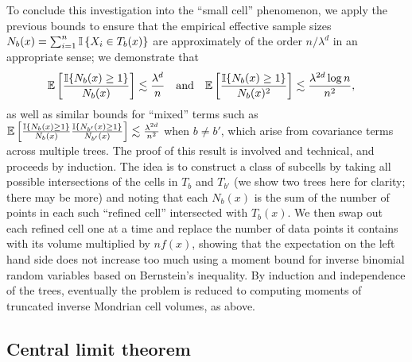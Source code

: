 To conclude this investigation into the ``small cell'' phenomenon,
we apply the previous bounds to
ensure that the empirical effective sample sizes
$N_b(x) = \sum_{i=1}^{n} \mathbb{I} \left\{ X_i \in T_b(x) \right\}$
are approximately of the order $n / \lambda^d$ in an appropriate sense;
we demonstrate that
%
\begin{align*}
  \mathbb{E}\left[
    \frac{\mathbb{I}\{N_b(x) \geq 1\}}{N_b(x)}
  \right]
  &\lesssim
  \frac{\lambda^d}{n}
  &&\text{and}
  &\mathbb{E}\left[
    \frac{\mathbb{I}\{N_b(x) \geq 1\}}{N_b(x)^2}
  \right]
  &\lesssim
  \frac{\lambda^{2d} \log n}{n^2},
\end{align*}
%
as well as similar bounds for ``mixed'' terms such as
%
$\mathbb{E} \left[
  \frac{\mathbb{I}\{N_b(x) \geq 1\}}{N_b(x)}
  \frac{\mathbb{I}\{N_{b'}(x) \geq 1\}}{N_{b'}(x)}
\right]
\lesssim \frac{\lambda^{2d}}{n^2}$
%
when $b \neq b'$, which arise from covariance terms across
multiple trees.
The proof of this result is involved and technical, and proceeds by
induction. The idea is to construct a class of subcells by taking
all possible intersections of the cells in $T_b$ and $T_{b'}$
(we show two trees here for clarity; there may be more)
and noting that each $N_b(x)$ is the sum of the number of points
in each such ``refined cell'' intersected with $T_b(x)$.
We then swap out each refined cell one at a time and replace
the number of data points it contains with its volume multiplied by $n f(x)$,
showing that the expectation on the left hand side does not increase too much
using a moment bound for inverse binomial random variables
based on Bernstein's inequality.
By induction and independence of the trees,
eventually the problem is reduced to computing moments
of truncated inverse Mondrian cell volumes, as above.

\subsection*{Central limit theorem}

